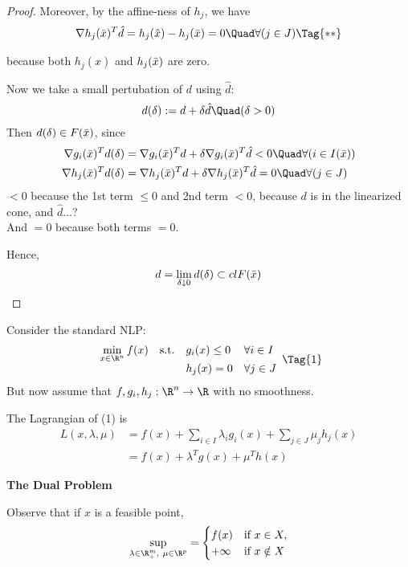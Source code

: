\begin{proof}
  Moreover, by the affine-ness of $h_j$, we have
  \begin{align*}
    \nabla h_j(\bx)^T\hat d = h_j(\hat x)-h_j(\bx)=0\Quad\forall(j\in J)\Tag{**}
  \end{align*}

  because both $h_j(\hat x)$ and $h_j(\bar x)$ are zero.

  Now we take a small pertubation of $d$ using $\hat d$:
  $$
    d(\delta):= d + \delta\hat d\Quad(\delta>0)
  $$
  Then $d(\delta)\in F(\bar x)$, since
  \begin{align*}
    \nabla g_i(\bx)^Td(\delta) & =\nabla g_i(\bx)^Td + \delta\nabla g_i(\bx)^T\hat d<0 \Quad\forall(i\in\Act) \\
    \nabla h_j(\bx)^Td(\delta) & =\nabla h_j(\bx)^Td + \delta\nabla h_j(\bx)^T\hat d=0 \Quad\forall(j\in J)
  \end{align*}
  $<0$ because the 1st term $\leq0$ and 2nd term $<0$, because $d$ is
  in the linearized cone, and $\hat d$...? \\
  And $=0$ because both terms $=0$.

  Hence,
  $$
    d=\lim_{\delta\downarrow0}d(\delta) \subset clF(\bar x)
  $$
\end{proof}

Consider the standard NLP:
\begin{equation*}
  \NlpStdForm\Tag{1}
\end{equation*}
But now assume that $f,g_i,h_j:\R^n\to\R$ with no smoothness.

The Lagrangian of (1) is
\begin{align*}
  L(x,\lambda,\mu)
   & =f(x)+\sum_{i\in I}\lambda_ig_i(x) + \sum_{j\in J}\mu_jh_j(x) \\
   & =f(x)+\lambda^Tg(x)+\mu^Th(x)
\end{align*}

\textbf{The Dual Problem}

Observe that if $x$ is a feasible point,
\begin{align*}
  \sup_{\lambda\in\R^m_+,\ \mu\in\R^p}=
  \begin{cases}
    f(x)    & \text{if }x\in X,   \\
    +\infty & \text{if }x\notin X
  \end{cases}
\end{align*}

%

